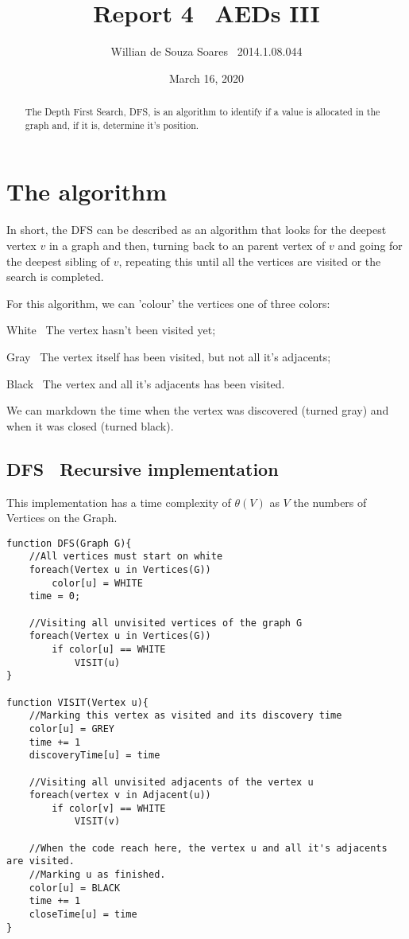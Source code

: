 \documentclass[10pt,a4paper]{article}
\author{Willian de Souza Soares \textendash\ 2014.1.08.044}
\title{Report 4 \textendash\ AEDs III}
\date{March 16, 2020}
\begin{document}
\maketitle
{}
\begin{abstract}
The Depth First Search, DFS, is an algorithm to identify if a value is allocated in the graph and, if it is, determine it's position. 
\end{abstract}
\section{The algorithm}
In short, the DFS can be described as an algorithm that looks for the deepest vertex $v$ in a graph and then, turning back to an parent vertex of $v$ and going for the deepest sibling of $v$, repeating this until all the vertices are visited or the search is completed.

For this algorithm, we can 'colour' the vertices one of three colors: 
\begin{list}{•}{}
\item White \textendash\ The vertex hasn't been visited yet;
\item Gray \textendash\ The vertex itself has been visited, but not all it's adjacents; 
\item Black \textendash\ The vertex and all it's adjacents has been visited.
\end{list}

We can markdown the time when the vertex was discovered (turned gray) and when it was closed (turned black).

\subsection{DFS \textendash\ Recursive implementation}
This implementation has a time complexity of $\theta(V)$ as $V$ the numbers of Vertices on the Graph.
\begin{lstlisting}
function DFS(Graph G){
	//All vertices must start on white
    foreach(Vertex u in Vertices(G))
        color[u] = WHITE
    time = 0;
    
    //Visiting all unvisited vertices of the graph G
    foreach(Vertex u in Vertices(G))
        if color[u] == WHITE
            VISIT(u)
}

function VISIT(Vertex u){
	//Marking this vertex as visited and its discovery time
    color[u] = GREY
    time += 1
    discoveryTime[u] = time
    
    //Visiting all unvisited adjacents of the vertex u
    foreach(vertex v in Adjacent(u))
        if color[v] == WHITE
            VISIT(v)
    
    //When the code reach here, the vertex u and all it's adjacents are visited.
    //Marking u as finished.
    color[u] = BLACK
    time += 1
    closeTime[u] = time
}
\end{lstlisting}
\end{document}
